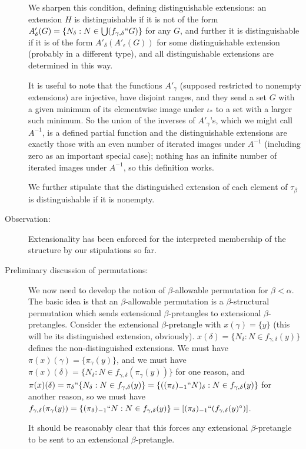\documentclass[112pt]{article}
\begin{document}
\begin{description}
We sharpen this condition, defining distinguishable extensions:  an extension $H$ is distinguishable if it is not of the form $A'_\delta(G)= \{N_\delta:N \in \bigcup (f_{\gamma,\delta}``G)\}$ for any $G$, and further it is distinguishable if it is of the form $A'_{\delta}(A'_{\epsilon}(G))$ for some distinguishable extension (probably in a different type), and all distinguishable extensions are determined in this way.

It is useful to note that the functions $A'_\gamma$ (supposed restricted to nonempty extensions) are injective, have disjoint ranges, and they send a set $G$ with a given minimum of its elementwise image under $\iota_*$ to a set with a larger such minimum.  So the union of the inverses of $A'_\gamma$'s, which we might call $A^{-1}$, is a defined partial function and the distinguishable extensions are exactly those with an even number of iterated images under $A^{-1}$ (including zero as an important special case);  nothing has an infinite number of iterated images under $A^{-1}$, so this definition works.

We further stipulate that the distinguished extension of each element of $\tau_\beta$ is distinguishable if it is nonempty.

\item[Observation:]  Extensionality has been enforced for the interpreted membership of the structure by our stipulations so far.

\item[Preliminary discussion of permutations:]  We now need to develop the notion of $\beta$-allowable permutation for $\beta<\alpha$.
The basic idea is that an $\beta$-allowable permutation is a $\beta$-structural permutation which sends extensional $\beta$-pretangles to extensional $\beta$-pretangles.  Consider the extensional $\beta$-pretangle with $x(\gamma) = \{y\}$ (this will be its distinguished extension, obviously).
$x(\delta) = \{N_\delta:N \in f_{\gamma,\delta}(y)\}$ defines the non-distinguished extensions.  We must have $\pi(x)(\gamma) = \{\pi_\gamma(y)\}$,
and we must have $\pi(x)(\delta) = \{N_\delta:N \in f_{\gamma,\delta}(\pi_\gamma(y))\}$ for one reason, and $\pi(x)(\delta) = \pi_\delta``\{N_\delta:N \in f_{\gamma,\delta}(y)\} = \{((\pi_\delta)_{-1}``N)_\delta:N \in f_{\gamma,\delta}(y)\}$ for another reason, so we must have
$f_{\gamma,\delta}(\pi_\gamma(y)) = \{(\pi_\delta)_{-1}``N:N \in f_{\gamma,\delta}(y)\} = [(\pi_\delta)_{-1}``(f_{\gamma,\delta}(y)^\circ)]$.

It should be reasonably clear that this forces any extensional $\beta$-pretangle to be sent to an extensional $\beta$-pretangle.


\end{description}
\end{document}
